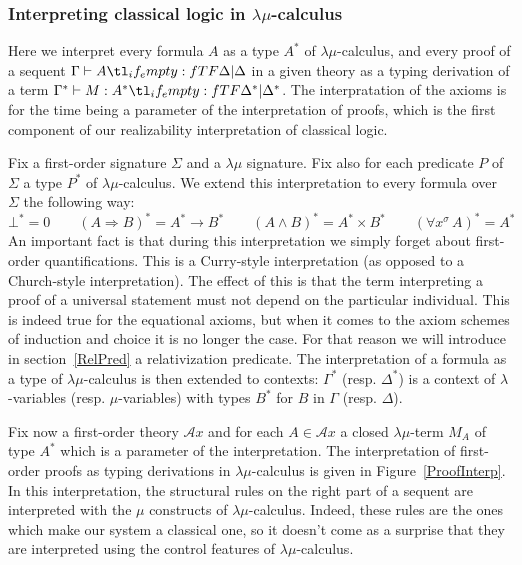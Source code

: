 \documentclass{CSML}
\newcommand*\ifpresent[3]{\tl_if_empty:fTF{#1}{#3}{#2}}
\newcommand*\Entails{\mathrel{\vdash}}
\newcommand*\BarSep{\mathrel{|}}
\newcommand*\Sequent[3]{#1\Entails#2\ifpresent{#3}{\BarSep}{}#3}
\newcommand*\SortA{\sigma}
\newcommand*\LogSortedTerm[2]{#1^{#2}}
\newcommand*\LogVarA{x}
\newcommand*\LogImp{\mathbin{\Rightarrow}}
\newcommand*\LogAnd{\mathbin{\wedge}}
\newcommand*\LogBot\bot
\newcommand*\LogFormA{A}
\newcommand*\LogFormB{B}
\newcommand*\LogAxioms{\mathcal{A}x}
\newcommand*\LogPredA{P}
\newcommand*\LmSortBot0
\newcommand*\LmSortTimes\times
\newcommand*\LmSortTo\to
\newcommand*\LmTerm[2]{#1\mathrel{:}#2}
\newcommand*\LmTermA{M}
\newcommand*\LmInterpForm[1]{{#1}^*}
\newcommand*\LmInterpAxiom[1]{M_{#1}}
\begin{document}
\subsubsection{Interpreting classical logic in \texorpdfstring{$\lambda\mu$}{lambda-mu}-calculus}
\label{LmInterp}
Here we interpret every formula $\LogFormA$ as a type $\LmInterpForm{\LogFormA}$ of $\lambda\mu$-calculus, and every proof of a sequent $\Sequent{\Gamma}{\LogFormA}{\Delta}$ in a given theory as a typing derivation of a term $\Sequent{\LmInterpForm{\Gamma}}{\LmTerm{\LmTermA}{\LmInterpForm{\LogFormA}}}{\LmInterpForm{\Delta}}$. The interpratation of the axioms is for the time being a parameter of the interpretation of proofs, which is the first component of our realizability interpretation of classical logic.\par
Fix a first-order signature $\Sigma$ and a $\lambda\mu$ signature. Fix also for each predicate $\LogPredA$ of $\Sigma$ a type $\LmInterpForm{\LogPredA}$ of $\lambda\mu$-calculus. We extend this interpretation to every formula over $\Sigma$ the following way:
$$\LmInterpForm{\LogBot}=\LmSortBot\qquad\LmInterpForm{\left(\LogFormA\LogImp\LogFormB\right)}=\LmInterpForm{\LogFormA}\LmSortTo\LmInterpForm{\LogFormB}\qquad\LmInterpForm{\left(\LogFormA\LogAnd\LogFormB\right)}=\LmInterpForm{\LogFormA}\LmSortTimes\LmInterpForm{\LogFormB}\qquad\LmInterpForm{\left(\forall\LogSortedTerm{\LogVarA}{\SortA}\,\LogFormA\right)}=\LmInterpForm{\LogFormA}$$
An important fact is that during this interpretation we simply forget about first-order quantifications. This is a Curry-style interpretation (as opposed to a Church-style interpretation). The effect of this is that the term interpreting a proof of a universal statement must not depend on the particular individual. This is indeed true for the equational axioms, but when it comes to the axiom schemes of induction and choice it is no longer the case. For that reason we will introduce in section~\ref{RelPred} a relativization predicate. The interpretation of a formula as a type of $\lambda\mu$-calculus is then extended to contexts: $\LmInterpForm{\Gamma}$ (resp. $\LmInterpForm{\Delta}$) is a context of $\lambda$-variables (resp. $\mu$-variables) with types $\LmInterpForm{\LogFormB}$ for $\LogFormB$ in $\Gamma$ (resp. $\Delta$).\par
Fix now a first-order theory $\LogAxioms$ and for each $\LogFormA\in\LogAxioms$ a closed $\lambda\mu$-term $\LmInterpAxiom{\LogFormA}$ of type $\LmInterpForm{\LogFormA}$ which is a parameter of the interpretation. The interpretation of first-order proofs as typing derivations in $\lambda\mu$-calculus is given in Figure~\ref{ProofInterp}. In this interpretation, the structural rules on the right part of a sequent are interpreted with the $\mu$ constructs of $\lambda\mu$-calculus. Indeed, these rules are the ones which make our system a classical one, so it doesn't come as a surprise that they are interpreted using the control features of $\lambda\mu$-calculus.
\end{document}
